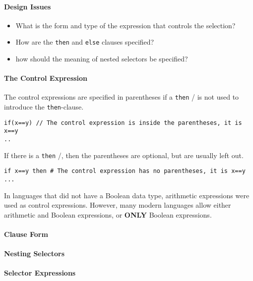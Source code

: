 \paragraph{Design Issues}\label{par:2_Way_Selection-Design_Issues}
\begin{itemize}[noitemsep]
\item What is the form and type of the expression that controls the selection?
\item How are the \texttt{then} and \texttt{else} clauses specified?
\item how should the meaning of nested selectors be specified?
\end{itemize}

\paragraph{The Control Expression}\label{par:2_Way_Selection-Control_Expression}
The control expressions are specified in parentheses if a \texttt{then} / is not used to introduce the \texttt{then}-clause.
\begin{verbatim}
if(x==y) // The control expression is inside the parentheses, it is x==y
..
\end{verbatim}

If there is a \texttt{then} /, then the parentheses are optional, but are usually left out.
\begin{verbatim}
if x==y then # The control expression has no parentheses, it is x==y
...
\end{verbatim}

In languages that did not have a Boolean data type, arithmetic expressions were used as control expressions.
However, many modern languages allow either arithmetic and Boolean expressions, or \textbf{ONLY} Boolean expressions.

\paragraph{Clause Form}\label{par:2_Way_Selection-Clause_Form}
\paragraph{Nesting Selectors}\label{par:2_Way_Selection-Nesting}
\paragraph{Selector Expressions}\label{par:2_Way_Selection-Selector_Expressions}

